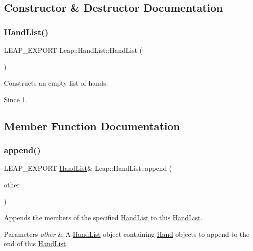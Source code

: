 \subsection{Constructor \& Destructor Documentation}
\mbox{\label{class_leap_1_1_hand_list_a98b159b1e306e8ae0da3d99ae1eba8d3}} 
\subsubsection{\texorpdfstring{Hand\+List()}{HandList()}}
{\footnotesize\ttfamily L\+E\+A\+P\+\_\+\+E\+X\+P\+O\+RT Leap\+::\+Hand\+List\+::\+Hand\+List (\begin{DoxyParamCaption}{ }\end{DoxyParamCaption})}

Constructs an empty list of hands. \begin{DoxySince}{Since}
1. 
\end{DoxySince}


\subsection{Member Function Documentation}
\mbox{\label{class_leap_1_1_hand_list_a7715a0e0df3e513c6cb1869691ef982d}} 
\subsubsection{\texorpdfstring{append()}{append()}}
{\footnotesize\ttfamily L\+E\+A\+P\+\_\+\+E\+X\+P\+O\+RT \hyperlink{class_leap_1_1_hand_list}{Hand\+List}\& Leap\+::\+Hand\+List\+::append (\begin{DoxyParamCaption}\item[{const \hyperlink{class_leap_1_1_hand_list}{Hand\+List} \&}]{other }\end{DoxyParamCaption})}

Appends the members of the specified \hyperlink{class_leap_1_1_hand_list}{Hand\+List} to this \hyperlink{class_leap_1_1_hand_list}{Hand\+List}. 
\begin{DoxyParams}{Parameters}
{\em other} & A \hyperlink{class_leap_1_1_hand_list}{Hand\+List} object containing \hyperlink{class_leap_1_1_hand}{Hand} objects to append to the end of this \hyperlink{class_leap_1_1_hand_list}{Hand\+List}. \\
\hline
\end{DoxyParams}
\mbox{\label{class_leap_1_1_hand_list_a134157c3f6bb1521b97a8194801788fc}} 
